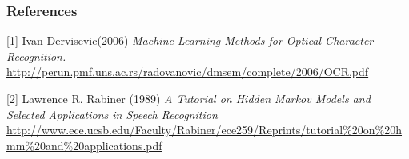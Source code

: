 \documentclass{article} %
\begin{document}
\subsubsection*{References}

\small{
[1] Ivan Dervisevic(2006) {\it Machine Learning Methods for Optical Character Recognition.} \url{http://perun.pmf.uns.ac.rs/radovanovic/dmsem/complete/2006/OCR.pdf}

[2] Lawrence R. Rabiner (1989) {\it A Tutorial on Hidden Markov Models and Selected Applications in Speech Recognition} \url{http://www.ece.ucsb.edu/Faculty/Rabiner/ece259/Reprints/tutorial\%20on\%20hmm\%20and\%20applications.pdf}
}
\end{document}
